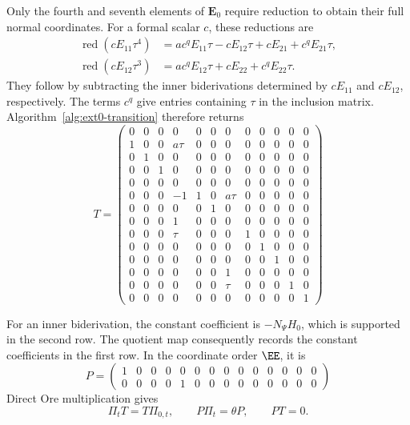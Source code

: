 Only the fourth and seventh elements of $\mathbf E_0$
require reduction to obtain their full normal coordinates.
For a formal scalar $c$, these reductions are
\begin{align}
 \operatorname{red}(cE_{11}\tau^4)
   &=a c^qE_{11}\tau-cE_{12}\tau
       +cE_{21}+c^qE_{21}\tau,\\
 \operatorname{red}(cE_{12}\tau^3)
   &=a c^qE_{12}\tau+cE_{22}+c^qE_{22}\tau.
 \label{eq:large-boundary-reductions}
\end{align}
They follow by subtracting the inner biderivations
determined by $cE_{11}$ and $cE_{12}$, respectively.
The terms $c^q$ give entries containing $\tau$ in the
inclusion matrix. Algorithm~\ref{alg:ext0-transition}
therefore returns
\begingroup
\setlength{\arraycolsep}{2pt}
\begin{equation}
 T=
\begin{pmatrix}
  0 & 0 & 0 & 0 & 0 & 0 & 0 & 0 & 0 & 0 & 0 & 0\\
  1 & 0 & 0 & a\tau & 0 & 0 & 0 & 0 & 0 & 0 & 0 & 0\\
  0 & 1 & 0 & 0 & 0 & 0 & 0 & 0 & 0 & 0 & 0 & 0\\
  0 & 0 & 1 & 0 & 0 & 0 & 0 & 0 & 0 & 0 & 0 & 0\\
  0 & 0 & 0 & 0 & 0 & 0 & 0 & 0 & 0 & 0 & 0 & 0\\
  0 & 0 & 0 & -1 & 1 & 0 & a\tau & 0 & 0 & 0 & 0 & 0\\
  0 & 0 & 0 & 0 & 0 & 1 & 0 & 0 & 0 & 0 & 0 & 0\\
  0 & 0 & 0 & 1 & 0 & 0 & 0 & 0 & 0 & 0 & 0 & 0\\
  0 & 0 & 0 & \tau & 0 & 0 & 0 & 1 & 0 & 0 & 0 & 0\\
  0 & 0 & 0 & 0 & 0 & 0 & 0 & 0 & 1 & 0 & 0 & 0\\
  0 & 0 & 0 & 0 & 0 & 0 & 0 & 0 & 0 & 1 & 0 & 0\\
  0 & 0 & 0 & 0 & 0 & 0 & 1 & 0 & 0 & 0 & 0 & 0\\
  0 & 0 & 0 & 0 & 0 & 0 & \tau & 0 & 0 & 0 & 1 & 0\\
  0 & 0 & 0 & 0 & 0 & 0 & 0 & 0 & 0 & 0 & 0 & 1
 \end{pmatrix}
 \label{eq:large-inclusion}
\end{equation}
\endgroup

For an inner biderivation, the constant coefficient is
$-N_\Psi H_0$, which is supported in the second row.
The quotient map consequently records the constant
coefficients in the first row. In the coordinate order
$\EE$, it is
\begin{equation}
 P=
\begin{pmatrix}
  1 & 0 & 0 & 0 & 0 & 0 & 0 & 0 & 0 & 0 & 0 & 0 & 0 & 0\\
  0 & 0 & 0 & 0 & 1 & 0 & 0 & 0 & 0 & 0 & 0 & 0 & 0 & 0
 \end{pmatrix}
 \label{eq:large-projection}
\end{equation}
Direct Ore multiplication gives
\begin{equation}
 \Pi_tT=T\Pi_{0,t},\qquad
 P\Pi_t=\theta P,\qquad PT=0.
 \label{eq:large-intertwining}
\end{equation}

